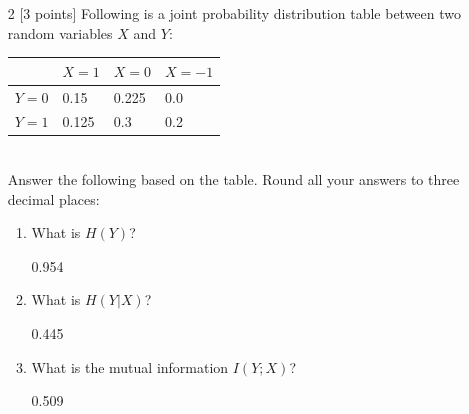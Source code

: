 \documentclass[11pt]{article}
\numberwithin{equation}{section} %
\numberwithin{figure}{section} %
\numberwithin{table}{section} %
\begin{document}
\begin{enumerate}
    \item[2] [3 points] Following is a joint probability distribution table between two random variables $X$ and $Y$:\\
        \begin{tabular}{|l|l|l|l|}
        \hline
                  & $X=1$ & $X=0$ & $X=-1$ \\ \hline
        $Y=0$ & 0.15      & 0.225     & 0.0        \\ \hline
        $Y=1$ & 0.125     & 0.3       & 0.2        \\ \hline
        \end{tabular} \\
    Answer the following based on the table. Round all your answers to three decimal places:\\
    \begin{enumerate}
        \item What is $H(Y)$?
        \begin{tcolorbox}[fit,height=0.7cm, width=0.3\linewidth, blank, borderline={1pt}{-2pt}]
        \begin{center}\huge0.954\end{center}
        \end{tcolorbox}
        \item What is $H(Y|X)$?
        \begin{tcolorbox}[fit,height=0.7cm, width=0.3\linewidth, blank, borderline={1pt}{-2pt}]
        \begin{center}\huge0.445\end{center}
        \end{tcolorbox}
        \item What is the mutual information $I(Y;X)$?
        \begin{tcolorbox}[fit,height=0.7cm, width=0.3\linewidth, blank, borderline={1pt}{-2pt}]
        \begin{center}\huge0.509\end{center}
        \end{tcolorbox}
    \end{enumerate}
    

\end{enumerate}
\end{document}
